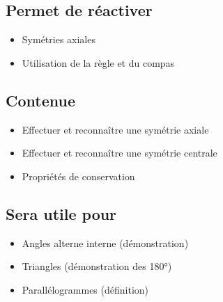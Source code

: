 \subsection{Permet de réactiver}
\begin{itemize}
    \item Symétries axiales
    \item Utilisation de la règle et du compas
\end{itemize}

\subsection{Contenue}
\begin{itemize}
    \item Effectuer et reconnaître une symétrie axiale
    \item Effectuer et reconnaître une symétrie centrale
    \item Propriétés de conservation
\end{itemize}

\subsection{Sera utile pour}
\begin{itemize}
    \item Angles alterne interne (démonstration)
    \item Triangles (démonstration des 180°)
    \item Parallélogrammes (définition)
\end{itemize}
